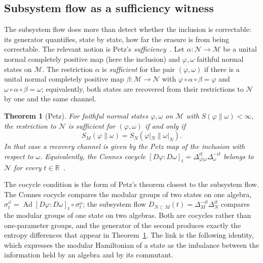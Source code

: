 \documentclass[a4paper,11pt]{article}
\newtheorem{theorem}{Theorem}
\theoremstyle{definition}
\begin{document}
\subsection{Subsystem flow as a sufficiency witness}\label{subsec:QEC-sufficiency}

The subsystem flow does more than detect whether the inclusion is correctable: its generator quantifies, state by state, how far the erasure is from being correctable. The relevant notion is Petz's \emph{sufficiency}~\cite{Petz1986,Petz1988,OhyaPetz1993}. Let $\alpha:\mathcal N\to\mathcal M$ be a unital normal completely positive map (here the inclusion) and $\varphi,\omega$ faithful normal states on $\mathcal M$. The restriction $\alpha$ is \emph{sufficient} for the pair $(\varphi,\omega)$ if there is a unital normal completely positive map $\beta:\mathcal M\to\mathcal N$ with $\varphi\circ\alpha\circ\beta=\varphi$ and $\omega\circ\alpha\circ\beta=\omega$; equivalently, both states are recovered from their restrictions to $\mathcal N$ by one and the same channel.

\begin{theorem}[Petz]\label{thm:Petz}
For faithful normal states $\varphi,\omega$ on $\mathcal M$ with $S(\varphi\|\omega)<\infty$, the restriction to $\mathcal N$ is sufficient for $(\varphi,\omega)$ if and only if
\[
 S_M(\varphi\|\omega)=S_N(\varphi|_N\|\omega|_N) .
\]
In that case a recovery channel is given by the Petz map of the inclusion with respect to $\omega$. Equivalently, the Connes cocycle $[D\varphi:D\omega]_t=\Delta_{\varphi|\omega}^{it}\Delta_{\omega}^{-it}$ belongs to $\mathcal N$ for every $t\in\mathbb R$~\cite{Petz1988,JencovaPetz2006}.
\end{theorem}

The cocycle condition is the form of Petz's theorem closest to the subsystem flow. The Connes cocycle compares the modular groups of two states on one algebra, $\sigma^{\varphi}_t=\operatorname{Ad}[D\varphi:D\omega]_t\circ\sigma^{\omega}_t$; the subsystem flow $D_{N\subset M}(t)=\Delta_M^{-it}\Delta_N^{it}$ compares the modular groups of one state on two algebras. Both are cocycles rather than one-parameter groups, and the generator of the second produces exactly the entropy differences that appear in Theorem~\ref{thm:Petz}. The link is the following identity, which expresses the modular Hamiltonian of a state as the imbalance between the information held by an algebra and by its commutant.
\end{document}
